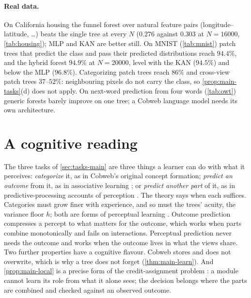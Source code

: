 \begin{table}[t]
\centering\small

\caption{MNIST accuracy (\%, three seeds); one tree per $7\times7$ patch.  ``label'': patch
trees categorize (Convolutional Cobweb); ``cross'': they predict the centre pixels of the
neighbouring patches; ``act'': they predict the class and pass its distribution;
``hybrid'': ``act'' plus labels.}
\label{tab:mnist}
\end{table}

\paragraph{Real data.}
On California housing the funnel forest over natural feature pairs
(longitude--latitude, \dots) beats the single tree at every $N$ ($0.276$ against $0.303$
at $N=16000$, \cref{tab:housing}); MLP and KAN are better still.  On MNIST
(\cref{tab:mnist}) patch trees that predict the class and pass their predicted
distributions reach $94.4\%$, and the hybrid forest $94.9\%$ at $N=20000$, level with the
KAN ($94.5\%$) and below the MLP ($96.8\%$).  Categorizing patch trees reach $86\%$ and
cross-view patch trees $37$--$52\%$: neighbouring pixels do not carry the class, so
\cref{prop:main-tasks}(d) does not apply.  On next-word prediction from four words
(\cref{tab:owt}) generic forests barely improve on one tree; a Cobweb language model
needs its own architecture.

\section{A cognitive reading}\label{sec:cog}

The three tasks of \cref{sec:tasks-main} are three things a learner can do with what it
perceives: \emph{categorize} it, as in Cobweb's original concept formation;
\emph{predict an outcome} from it, as in associative learning \citep{rescorla1972}; or
\emph{predict another part} of it, as in predictive-processing accounts of perception
\citep{clark2013}.  The theory says when each suffices.  Categories must grow finer with
experience, and so must the trees' acuity, the variance floor $h$; both are forms of
perceptual learning \citep{goldstone1998}.  Outcome prediction compresses a percept to what
matters for the outcome, which works when parts combine monotonically and fails on
interactions.  Perceptual prediction never needs the outcome and works when the outcome
lives in what the views share.  Two further properties have a cognitive flavour.  Cobweb
stores and does not overwrite, which is why a tree does not forget
(\cref{thm:main-learn}).  And \cref{prop:main-local} is a precise form of the
credit-assignment problem \citep{minsky1961}: a module cannot learn its role from what it
alone sees; the decision belongs where the parts are combined and checked against an
observed outcome.

